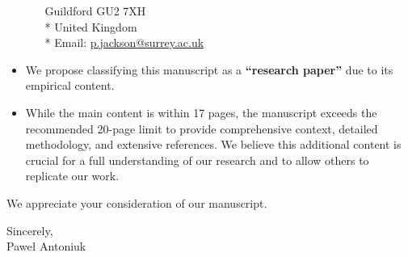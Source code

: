 \documentclass[a4paper,12pt]{article}
\begin{document}
\begin{itemize}
\begin{itemize}
          Guildford GU2 7XH \\*
          United Kingdom \\*
          Email: \href{mailto:p.jackson@surrey.ac.uk}{p.jackson@surrey.ac.uk}
        \end{itemize}
  \item We propose classifying this manuscript as a \textbf{``research paper''} due to its empirical content.
  \item While the main content is within 17 pages, the manuscript exceeds the recommended 20-page limit to provide comprehensive context, detailed methodology, and extensive references. We believe this additional content is crucial for a full understanding of our research and to allow others to replicate our work.
\end{itemize}

We appreciate your consideration of our manuscript.

\vspace{1cm}

Sincerely, \\
Paweł Antoniuk
\end{document}
